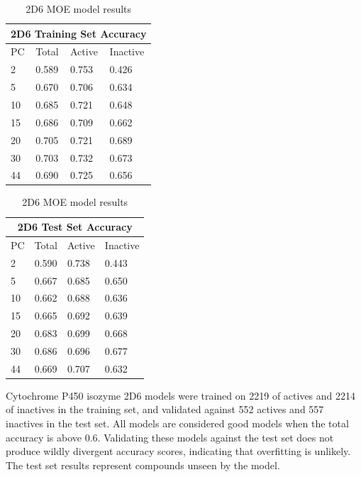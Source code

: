 \begin{table}[!h]
\begin{minipage}{.5\linewidth}
\centering
\begin{tabular}{|l|l|l|l|}
\hline
\multicolumn{4}{|c|}{2D6 Training Set Accuracy} \\ \hline
PC & Total          & Active          & Inactive\\ \hline
2  & 0.589          & 0.753           & 0.426   \\ \hline
5  & 0.670          & 0.706           & 0.634   \\ \hline
10 & 0.685          & 0.721           & 0.648   \\ \hline
15 & 0.686          & 0.709           & 0.662   \\ \hline
20 & 0.705          & 0.721           & 0.689   \\ \hline
30 & 0.703          & 0.732           & 0.673   \\ \hline
44 & 0.690          & 0.725           & 0.656   \\ \hline
\end{tabular}
\end{minipage}
\begin{minipage}{.5\linewidth}
\centering
\begin{tabular}{|l|l|l|l|}
\hline
\multicolumn{4}{|c|}{2D6 Test Set Accuracy}      \\ \hline
PC & Total          & Active          & Inactive \\ \hline
2  & 0.590          & 0.738           & 0.443    \\ \hline
5  & 0.667          & 0.685           & 0.650    \\ \hline
10 & 0.662          & 0.688           & 0.636    \\ \hline
15 & 0.665          & 0.692           & 0.639    \\ \hline
20 & 0.683          & 0.699           & 0.668    \\ \hline
30 & 0.686          & 0.696           & 0.677    \\ \hline
44 & 0.669          & 0.707           & 0.632    \\ \hline
\end{tabular}
\end{minipage}
\caption{2D6 MOE model results}
\end{table}

Cytochrome P450 isozyme 2D6 models were trained on 2219 of actives and 2214 of inactives in the training set, and validated against 552 actives and 557 inactives in the test set. All models are considered good models when the total accuracy is above 0.6. Validating these models against the test set does not produce wildly divergent accuracy scores, indicating that overfitting is unlikely. The test set results represent compounds unseen by the model. 

